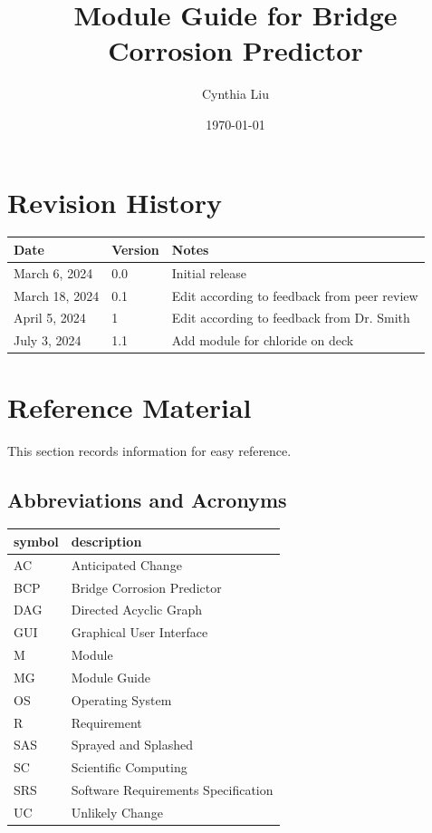 \documentclass[12pt, titlepage]{article}
\begin{document}
\title{Module Guide for Bridge Corrosion Predictor} 
\author{Cynthia Liu}
\date{\today}

\maketitle


\section{Revision History}

\begin{tabularx}{\textwidth}{p{3cm}p{2cm}X}
\toprule {\bf Date} & {\bf Version} & {\bf Notes}\\
\midrule
March 6, 2024 & 0.0 & Initial release\\
March 18, 2024 & 0.1 & Edit according to feedback from peer review \\
April 5, 2024 & 1 & Edit according to feedback from Dr. Smith\\
July 3, 2024 & 1.1 & Add module for chloride on deck\\
\bottomrule
\end{tabularx}

\newpage

\section{Reference Material}

This section records information for easy reference.

\subsection{Abbreviations and Acronyms}

\renewcommand{\arraystretch}{1.2}
\begin{tabular}{l l} 
  \toprule		
  \textbf{symbol} & \textbf{description}\\
  \midrule 
  AC & Anticipated Change\\
  BCP & Bridge Corrosion Predictor\\
  DAG & Directed Acyclic Graph \\
  GUI & Graphical User Interface \\
  M & Module \\
  MG & Module Guide \\
  OS & Operating System \\
  R & Requirement\\
  SAS & Sprayed and Splashed \\
  SC & Scientific Computing \\
  SRS & Software Requirements Specification\\
  UC & Unlikely Change \\
  \bottomrule
\end{tabular}\\
\end{document}

